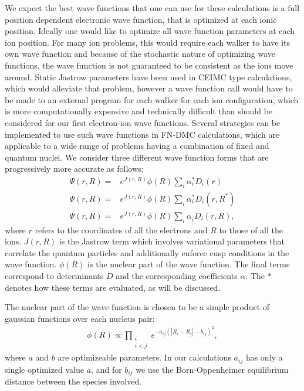 \documentclass[aip,jcp,numerical,reprint]{revtex4-1}
\begin{document}
We expect the best wave functions that one can use for these calculations is a full position dependent electronic wave function, that is optimized at each ionic position.  Ideally one would like to optimize all wave function parameters at each ion position.  For many ion problems, this would require each walker to have its own wave function and because of the stochastic nature of optimizing wave functions, the wave function is not guaranteed to be consistent as the ions move around.  Static Jastrow parameters have been used in CEIMC type calculations, which would alleviate that problem, however a wave function call would have to be made to an external program for each walker for each  ion configuration, which is more computationally expensive and technically difficult than should be considered for our first electron-ion wave functions.   
Several strategies can be implemented to use such wave functions in FN-DMC calculations, which are applicable to a wide range of problems having a combination of fixed and quantum nuclei.  
We consider three different wave function forms that are progressively more accurate as follows:
\begin{align}
\Psi(r,R) =& e^{J(r,R)}\phi(R)\sum_{i}\alpha^{*}_{i} D_{i}(r) \label{eqn:wfs1}\\
\Psi(r,R) =&e^{J(r,R)}\phi(R)\sum_{i}\alpha^{*}_{i} D_{i}(r,R^{*}) \label{eqn:wfs2}\\
\Psi(r,R) =& e^{J(r,R)}\phi(R)\sum_{i}\alpha^{}_{i} D_{i}(r,R), \label{eqn:wfs3}
\end{align}
where $r$ refers to the coordinates of all the electrons and $R$ to those of all the ions.  $J(r,R)$ is the Jastrow term which involves variational parameters that correlate the quantum particles and additionally  enforce cusp conditions in the wave function.  $\phi(R)$ is the nuclear part of the wave function. The final terms correspond to determinants $D$ and the corresponding coefficients $\alpha$.    The $*$ denotes how these terms are evaluated, as will be discussed. 

The nuclear part of the wave function is chosen to be a simple product of gaussian functions over each nucleus pair: 
\begin{align}
\phi(R) \propto \prod_{\substack{i \\ i<j}} e^{-a_{ij}\left(|R_{i}-R_{j}|-b_{ij}\right)^2}, 
\end{align}
where $a$ and $b$ are optimizeable parameters. In our calculations $a_{ij}$ has only a single optimized value $a$, and for $b_{ij}$ we use the Born-Oppenheimer equilibrium distance between the species involved.
\end{document}
